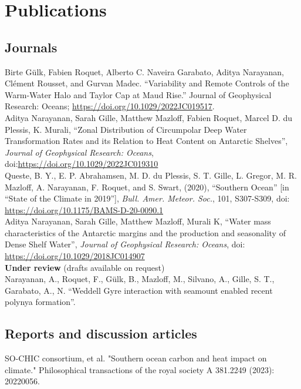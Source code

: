 \documentclass[12pt, a4paper]{article}
\newcommand{\years}[1]{\marginnote{\small #1}}
\begin{document}
\section*{Publications}

\subsection*{\bf Journals}
\years{2023} Birte Gülk, Fabien Roquet, Alberto C. Naveira Garabato, Aditya Narayanan, Clément Rousset, and Gurvan Madec. “Variability and Remote Controls of the Warm-Water Halo and Taylor Cap at Maud Rise.” Journal of Geophysical Research: Oceans; \url{https://doi.org/10.1029/2022JC019517}.\\
\years{2023} Aditya Narayanan, Sarah Gille, Matthew Mazloff, Fabien Roquet, Marcel D. du Plessis, K. Murali, ``Zonal Distribution of Circumpolar Deep Water Transformation Rates and its Relation to Heat Content on Antarctic Shelves'', \emph{Journal of Geophysical Research: Oceans}, doi:\url{https://doi.org/10.1029/2022JC019310}\\
\years{2020} Queste, B. Y., E. P. Abrahamsen, M. D. du Plessis, S. T. Gille, L. Gregor, M. R. Mazloff, A. Narayanan, F. Roquet, and S. Swart, (2020), ``Southern Ocean'' [in ``State of the Climate in 2019''], \emph{Bull. Amer. Meteor. Soc.}, 101, S307-S309, doi: \url{https://doi.org/10.1175/BAMS-D-20-0090.1}\\
\years{2019}Aditya Narayanan, Sarah Gille, Matthew Mazloff, Murali K, ``Water mass characteristics of the Antarctic margins and the production and seasonality of Dense Shelf Water'', \emph{Journal of Geophysical Research: Oceans}, doi: \url{https://doi.org/10.1029/2018JC014907}\\


{\bf Under review} (drafts available on request)\\

\years{2022} Narayanan, A., Roquet, F., G\"ulk, B., Mazloff, M., Silvano, A., Gille, S. T., Garabato, A., N. ``Weddell Gyre interaction with seamount enabled recent polynya formation''.\\


\subsection*{\bf Reports and discussion articles}
\years{2023} SO-CHIC consortium, et al. "Southern ocean carbon and heat impact on climate." Philosophical transactions of the royal society A 381.2249 (2023): 20220056.\\
\end{document}
